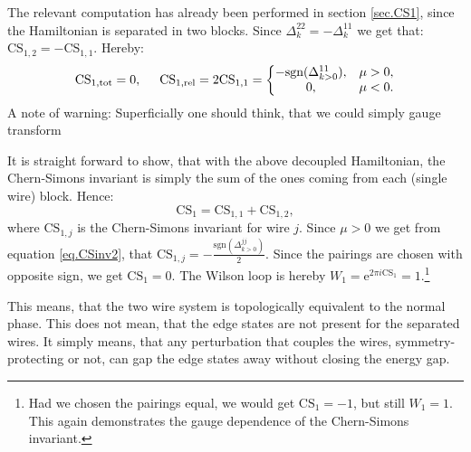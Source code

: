 The relevant computation has already been performed in section \ref{sec.CS1}, since the Hamiltonian is separated in two blocks. Since $\Delta^{22}_k = - \Delta^{11}_k$ we get that: $\text{CS}_{1,2} = -\text{CS}_{1,1}$. Hereby: 
\begin{equation}
\text{CS}_{1,\text{tot}} = 0, \hspace{0.5cm} \text{CS}_{1,\text{rel}} = 2\text{CS}_{1,1} = \left\{ \begin{matrix} -\text{sgn}(\Delta^{11}_{k>0}), & \mu > 0, \\ 0, & \mu < 0. \end{matrix} \right.
\end{equation}
A note of warning: Superficially one should think, that we could simply gauge transform 

It is straight forward to show, that with the above decoupled Hamiltonian, the Chern-Simons invariant is simply the sum of the ones coming from each (single wire) block. Hence:
\begin{equation}
\text{CS}_1 = \text{CS}_{1,1} + \text{CS}_{1,2}, \nonumber
\end{equation}
where $\text{CS}_{1,j}$ is the Chern-Simons invariant for wire $j$. Since $\mu > 0$ we get from equation \eqref{eq.CSinv2}, that $\text{CS}_{1,j} = -\frac{\text{sgn}(\Delta^{jj}_{k>0})}{2}$. Since the pairings are chosen with opposite sign, we get $\text{CS}_1 = 0$. The Wilson loop is hereby $W_1 = \text{e}^{2\pi i \text{CS}_1} = 1$.\footnote{Had we chosen the pairings equal, we would get $\text{CS}_1 = -1$, but still $W_1 = 1$. This again demonstrates the gauge dependence of the Chern-Simons invariant.}

This means, that the two wire system is topologically equivalent to the normal phase. This does not mean, that the edge states are not present for the separated wires. It simply means, that any perturbation that couples the wires, symmetry-protecting or not, can gap the edge states away without closing the energy gap.


